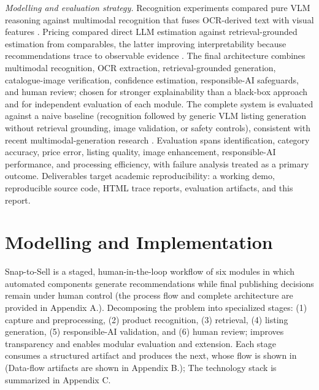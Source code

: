 \documentclass[conference]{IEEEtran}
\begin{document}
\textit{Modelling and evaluation strategy.} Recognition experiments compared
pure VLM reasoning against multimodal recognition that fuses OCR-derived text
with visual features \cite{ocrfusion2023,radford2021clip}. Pricing compared
direct LLM estimation against retrieval-grounded estimation from comparables,
the latter improving interpretability because recommendations trace to
observable evidence \cite{llp2025}. The final architecture combines multimodal
recognition, OCR extraction, retrieval-grounded generation, catalogue-image
verification, confidence estimation, responsible-AI safeguards, and human
review; chosen for stronger explainability than a black-box approach and for
independent evaluation of each module. The complete system is evaluated against
a naive baseline (recognition followed by generic VLM listing generation without
retrieval grounding, image validation, or safety controls), consistent with
recent multimodal-generation research \cite{li2024modict}. Evaluation spans
identification, category accuracy, price error, listing quality, image
enhancement, responsible-AI performance, and processing efficiency, with failure
analysis treated as a primary outcome. Deliverables target academic
reproducibility: a working demo, reproducible source code, HTML trace reports,
evaluation artifacts, and this report.

\section{Modelling and Implementation}

Snap-to-Sell is a staged, human-in-the-loop workflow of six modules in which
automated components generate recommendations while final publishing decisions
remain under human control (the process flow and complete architecture are
provided in Appendix A.). Decomposing the
problem into specialized stages: (1) capture and preprocessing, (2) product
recognition, (3) retrieval, (4) listing generation, (5) responsible-AI
validation, and (6) human review; improves transparency and enables modular
evaluation and extension. Each stage consumes a structured artifact and produces
the next, whose flow is shown in (Data-flow artifacts are shown in Appendix B.);
The technology stack is summarized in Appendix C.
\end{document}
